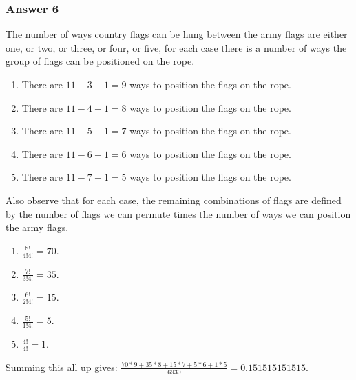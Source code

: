 \documentclass[11pt]{article}
\begin{document}
\subsubsection{Answer 6}
\label{sec-1-2-3}
The number of ways country flags can be hung between the army flags are
either one, or two, or three, or four, or five, for each case there is
a number of ways the group of flags can be positioned on the rope.
\begin{enumerate}
\item There are $11-3+1=9$ ways to position the flags on the rope.
\item There are $11-4+1=8$ ways to position the flags on the rope.
\item There are $11-5+1=7$ ways to position the flags on the rope.
\item There are $11-6+1=6$ ways to position the flags on the rope.
\item There are $11-7+1=5$ ways to position the flags on the rope.
\end{enumerate}

Also observe that for each case, the remaining combinations of flags
are defined by the number of flags we can permute times the number of
ways we can position the army flags.

\begin{enumerate}
\item $\frac{8!}{4!4!} = 70$.
\item $\frac{7!}{3!4!} = 35$.
\item $\frac{6!}{2!4!} = 15$.
\item $\frac{5!}{1!4!} = 5$.
\item $\frac{4!}{4!} = 1$.
\end{enumerate}

Summing this all up gives:
$\frac{70*9+35*8+15*7+5*6+1*5}{6930} = \num{0.151515151515}$.
\end{document}
